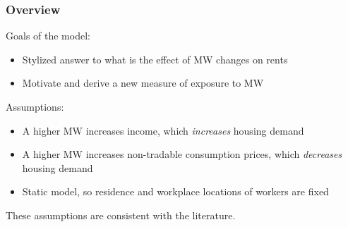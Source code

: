 \documentclass[aspectratio=169, t]{beamer}
\begin{document}
\begin{frame}
    \frametitle{Overview}
    
    Goals of the model:
    \begin{itemize}
        \item Stylized answer to what is the effect of MW changes on rents
        \item Motivate and derive a new measure of exposure to MW
    \end{itemize}
    
    \pause
    \vspace{3mm}
    Assumptions:
    \begin{itemize}
        \item A higher MW increases income, which \textit{increases} housing demand
        \item A higher MW increases non-tradable consumption prices, which \textit{decreases} housing demand
        \item Static model, so residence and workplace locations of workers are fixed
    \end{itemize}

    \vspace{2mm}
    These assumptions are consistent with the literature.

\end{frame}
\end{document}

